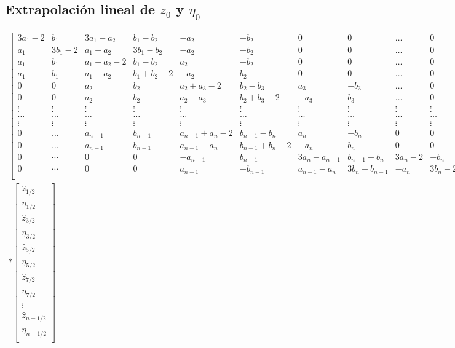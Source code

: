 \documentclass[]{article}%
\newcommand{\hz}{\hat{z}}
\newcommand{\heta}{\hat{\eta}}
\begin{document}
\subsection*{Extrapolación lineal de $z_0$ y $\eta_0$}
\begin{equation}
\begin{split}
\begin{bmatrix}
3a_1-2  & b_1 &3a_1-a_2 &b_1-b_2 &-a_2 &-b_2 & 0 &0&\dots &0  \\
a_1  & 3b_1-2 &a_1-a_2 &3b_1-b_2 &-a_2 &-b_2 &0&0& \dots &0  \\
a_1&b_1&a_1+a_2-2& b_1-b_2& a_2 & -b_2&0&0&\dots &0 \\
a_1&b_1&a_1-a_2& b_1+b_2-2&-a_2 &b_2&0&0&\dots &0 \\
0&0&a_2&b_2&a_2+a_3-2& b_2-b_3& a_3 & -b_3&\dots &0 \\
0&0&a_2&b_2&a_2-a_3& b_2+b_3-2&-a_3 &b_3&\dots &0 \\
\vdots  & \vdots &\vdots &\vdots &\vdots &\vdots & \vdots &\vdots &\vdots &\vdots  \\
\dots  & \dots &\dots &\dots &\dots &\dots & \dots &\dots &\dots &\dots  \\
\vdots  & \vdots &\vdots &\vdots &\vdots &\vdots & \vdots &\vdots &\vdots &\vdots  \\
0&\dots  &a_{n-1}&b_{n-1}&a_{n-1}+a_n-2& b_{n-1}-b_n& a_n & -b_n & 0 & 0 \\
0&\dots  &a_{n-1}&b_{n-1}&a_{n-1}-a_n& b_{n-1}+b_n-2&-a_n &b_n & 0 & 0 \\
0  & \cdots &0 &0 &-a_{n-1} &b_{n-1} & 3a_n-a_{n-1} &b_{n-1}-b_n &3a_n-2 &-b_n  \\
0  & \cdots &0 &0 &a_{n-1} &-b_{n-1} & a_{n-1}-a_n &3b_n-b_{n-1} & -a_n &3b_n-2  \\
\end{bmatrix} \\ \ast
\begin{bmatrix}
\hz_{1/2} \\ \heta_{1/2} \\
\hz_{3/2} \\ \heta_{3/2} \\
\hz_{5/2} \\ \heta_{5/2} \\
\hz_{7/2} \\ \heta_{7/2} \\
\vdots \\ %
\hz_{n-1/2} \\ \heta_{n-1/2} \\

\end{bmatrix}
\end{split}
\end{equation}
\end{document}
